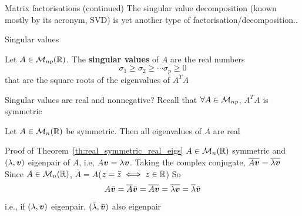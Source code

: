 \documentclass[aspectratio=169]{beamer}\usepackage[]{graphicx}\usepackage[]{xcolor}
\begin{document}


\begin{frame}{Matrix factorisations (continued)}
The singular value decomposition (known mostly by its acronym, SVD) is yet another type of factorisation/decomposition..
\end{frame}

\begin{frame}{Singular values}
\begin{importantdefinition}
Let $A\in\mathcal{M}_{np}(\mathbb{R})$. The \textbf{singular values} of $A$ are the real numbers 
\[
\sigma_1\geq \sigma_2\geq\cdots\sigma_p\geq 0
\]
that are the square roots of the eigenvalues of $A^TA$
\end{importantdefinition}
\end{frame}


\begin{frame}{Singular values are real and nonnegative?}
Recall that $\forall A\in\mathcal{M}_{np}$, $A^TA$ is symmetric
\vfill
\begin{importanttheorem}\label{th:real_symmetric_real_eigs}
Let $A\in\mathcal{M}_n(\mathbb{R})$ be symmetric. Then all eigenvalues of $A$ are real
\end{importanttheorem}
\end{frame}

\begin{frame}{Proof of Theorem~\ref{th:real_symmetric_real_eigs}}
$A\in\mathcal{M}_n(\mathbb{R})$ symmetric and $(\lambda,\bm{v})$ eigenpair of $A$, i.e, $A\bm{v}=\lambda\bm{v}$. Taking the complex conjugate, $\overline{A\bm{v}}=\overline{\lambda\bm{v}}$
\vfill
Since $A\in\mathcal{M}_n(\mathbb{R})$, $\overline{A}=A$\qquad ($z=\bar z\iff z\in\mathbb{R}$)
\vfill
So
\[
A\bar{\bm{v}}=\overline{A}\bar{\bm{v}}=\overline{A\bm{v}}=\overline{\lambda\bm{v}}=\overline{\lambda}\bar{\bm{v}}
\]
i.e., if $(\lambda,\bm{v})$ eigenpair, $(\bar\lambda,\bar{\bm{v}})$ also eigenpair
\end{frame}
\end{document}

